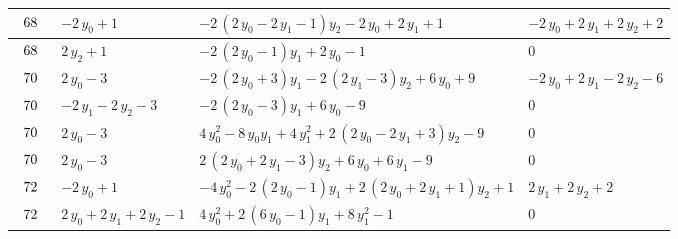 \begin{table}[H]
\begin{center}
{\begin{tabular}{|l|l|l|l|}
$\begin{tabular}{l}
68 \\
\end{tabular}$ & $ -2 \, y_{0} + 1 $ & $ -2 \, {\left(2 \, y_{0} - 2 \, y_{1} - 1\right)} y_{2} - 2 \, y_{0} + 2 \, y_{1} + 1 $ & $ -2 \, y_{0} + 2 \, y_{1} + 2 \, y_{2} + 2 $ \\ \hline
$\begin{tabular}{l}
68 \\
\end{tabular}$ & $ 2 \, y_{2} + 1 $ & $ -2 \, {\left(2 \, y_{0} - 1\right)} y_{1} + 2 \, y_{0} - 1 $ & $ 0 $ \\ \hline
$\begin{tabular}{l}
70 \\
\end{tabular}$ & $ 2 \, y_{0} - 3 $ & $ -2 \, {\left(2 \, y_{0} + 3\right)} y_{1} - 2 \, {\left(2 \, y_{1} - 3\right)} y_{2} + 6 \, y_{0} + 9 $ & $ -2 \, y_{0} + 2 \, y_{1} - 2 \, y_{2} - 6 $ \\ \hline
$\begin{tabular}{l}
70 \\
\end{tabular}$ & $ -2 \, y_{1} - 2 \, y_{2} - 3 $ & $ -2 \, {\left(2 \, y_{0} - 3\right)} y_{1} + 6 \, y_{0} - 9 $ & $ 0 $ \\ \hline
$\begin{tabular}{l}
70 \\
\end{tabular}$ & $ 2 \, y_{0} - 3 $ & $ 4 \, y_{0}^{2} - 8 \, y_{0} y_{1} + 4 \, y_{1}^{2} + 2 \, {\left(2 \, y_{0} - 2 \, y_{1} + 3\right)} y_{2} - 9 $ & $ 0 $ \\ \hline
$\begin{tabular}{l}
70 \\
\end{tabular}$ & $ 2 \, y_{0} - 3 $ & $ 2 \, {\left(2 \, y_{0} + 2 \, y_{1} - 3\right)} y_{2} + 6 \, y_{0} + 6 \, y_{1} - 9 $ & $ 0 $ \\ \hline
$\begin{tabular}{l}
72 \\
\end{tabular}$ & $ -2 \, y_{0} + 1 $ & $ -4 \, y_{0}^{2} - 2 \, {\left(2 \, y_{0} - 1\right)} y_{1} + 2 \, {\left(2 \, y_{0} + 2 \, y_{1} + 1\right)} y_{2} + 1 $ & $ 2 \, y_{1} + 2 \, y_{2} + 2 $ \\ \hline
$\begin{tabular}{l}
72 \\
\end{tabular}$ & $ 2 \, y_{0} + 2 \, y_{1} + 2 \, y_{2} - 1 $ & $ 4 \, y_{0}^{2} + 2 \, {\left(6 \, y_{0} - 1\right)} y_{1} + 8 \, y_{1}^{2} - 1 $ & $ 0 $ \\ \hline

\end{tabular}}
\end{center}
\end{table}
